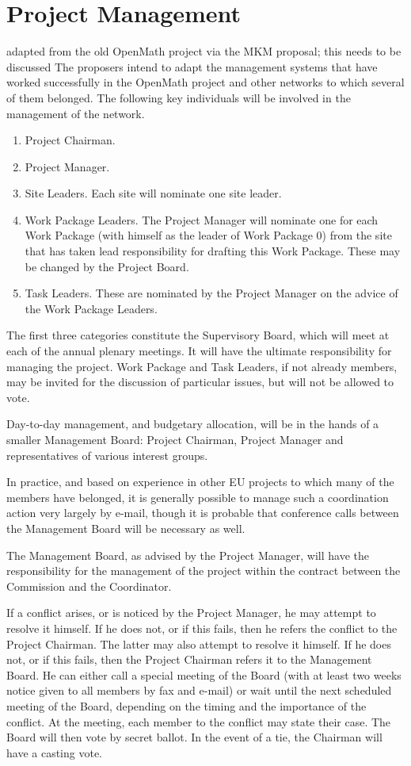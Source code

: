 \documentclass{euproposal}
\begin{document}
\chapter{Project Management}\label{cha:management}
\begin{newpart}{adapted from the old OpenMath project via the MKM proposal; this
    needs to be discussed}   
  The proposers intend to adapt the management systems that have
  worked successfully in the OpenMath project and other networks to
  which several of them belonged. The following key individuals will
  be involved in the management of the network.
\begin{enumerate}
\item Project Chairman. 
\item Project Manager. 
\item Site Leaders. Each site will nominate one site leader.
\item Work Package Leaders. The Project Manager will nominate one for
  each Work Package (with himself as the leader of Work Package 0)
  from the site that has taken lead responsibility for drafting this
  Work Package. These may be changed by the Project Board.
\item Task Leaders. These are nominated by the Project Manager on the
  advice of the Work Package Leaders.
\end{enumerate}
The first three categories constitute the Supervisory Board, which
will meet at each of the annual plenary meetings.  It will have the
ultimate responsibility for managing the project. Work Package and
Task Leaders, if not already members, may be invited for the
discussion of particular issues, but will not be allowed to vote.
   
Day-to-day management, and budgetary allocation, will be in the hands
of a smaller Management Board: Project Chairman, Project Manager and
representatives of various interest groups.

In practice, and based on experience in other EU projects to which
many of the members have belonged, it is generally possible to manage
such a coordination action very largely by e-mail, though it is
probable that conference calls between the Management Board will be
necessary as well.
  
The Management Board, as advised by the Project Manager, will have the
responsibility for the management of the project within the contract
between the Commission and the Coordinator.
  
If a conflict arises, or is noticed by the Project Manager, he may
attempt to resolve it himself. If he does not, or if this fails, then
he refers the conflict to the Project Chairman. The latter may also
attempt to resolve it himself. If he does not, or if this fails, then
the Project Chairman refers it to the Management Board. He can either
call a special meeting of the Board (with at least two weeks notice
given to all members by fax and e-mail) or wait until the next
scheduled meeting of the Board, depending on the timing and the
importance of the conflict.  At the meeting, each member to the
conflict may state their case. The Board will then vote by secret
ballot. In the event of a tie, the Chairman will have a casting vote.


\end{newpart}
\end{document}
